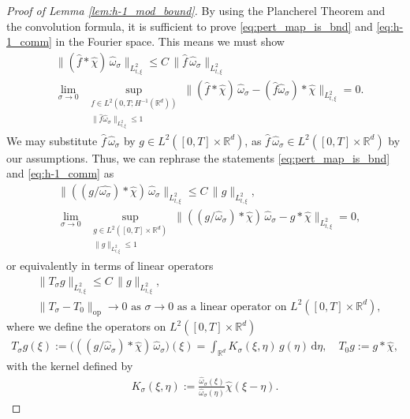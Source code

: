 \documentclass[reqno, 11pt]{amsart}
\numberwithin{equation}{section}
\theoremstyle{definition}
\begin{document}
\begin{proof}[Proof of Lemma \ref{lem:h-1_mod_bound}]
    By using the Plancherel Theorem and the convolution formula, it is sufficient to prove \eqref{eq:pert_map_is_bnd} and \eqref{eq:h-1_comm} in the Fourier space. This means we must show
    \begin{align*}
        &\|(\hat{f}\ast\hat{\chi})\,\hat{\omega}_\sigma\|_{L_{t,\xi}^2}\leq C\,\|\hat{f}\,\hat{\omega}_\sigma\|_{L_{t,\xi}^2}\\
        &\lim_{\sigma\to 0}\;\sup_{\substack{f\in L^2(0,T;H^{-1}(\mathbb{R}^{d})) \\ \|\hat{f}\hat{\omega}_\sigma\|_{L_{t,\xi}^2}\leq 1}} \|(\hat{f}\ast\hat{\chi})\,\hat{\omega}_\sigma-(\hat{f}\hat{\omega}_\sigma)\ast\hat{\chi}\|_{L_{t,\xi}^2}=0.
    \end{align*}
    We may substitute $\hat{f}\, \hat{\omega}_\sigma$ by $g\in L^2([0,T]\times \mathbb{R}^{d})$, as $\hat{f}\,\hat{\omega}_\sigma\in L^2([0,T]\times \mathbb{R}^{d})$ by our assumptions. Thus, we can rephrase the statements \eqref{eq:pert_map_is_bnd} and \eqref{eq:h-1_comm} as
    \begin{align*}
        &\|((g/\hat{\omega_\sigma})\ast\hat{\chi})\,\hat{\omega}_\sigma\|_{L_{t,\xi}^2}\leq C\,\|g\|_{L_{t,\xi}^2},\\
        &\lim_{\sigma\to 0}\;\sup_{\substack{g\in L^2([0,T]\times \mathbb{R}^{d}) \\ \|g\|_{L_{t,\xi}^2}\leq 1}} \|((g/\hat{\omega}_\sigma)\ast\hat{\chi})\,\hat{\omega}_\sigma-g\ast\hat{\chi}\|_{L_{t,\xi}^2}=0,
    \end{align*}
    or equivalently in terms of linear operators
    \begin{align*}
        &\|T_\sigma g\|_{L_{t,\xi}^2}\leq C\,\|g\|_{L_{t,\xi}^2},\\
        &\| T_\sigma-T_0\|_{\mathrm{op}}\rightarrow 0\text{ as }\sigma\rightarrow 0\text{ as a linear operator on }L^2([0,T]\times \mathbb{R}^{d}),
    \end{align*}
    where we define the operators on $L^2([0,T]\times \mathbb{R}^{d})$
    \begin{align*}
        T_\sigma g(\xi)
        :=\big(((g/\hat{\omega}_\sigma)\ast\hat{\chi})\,\hat{\omega}_\sigma\big)(\xi)=\int_{\mathbb{R}^{d}}K_\sigma(\xi,\eta)\,g(\eta)\,\mathrm{d}\eta,\quad
        T_0 g:=g\ast\hat{\chi},
    \end{align*}
    with the kernel defined by
    \begin{align*}
        K_\sigma(\xi,\eta):=\frac{\hat{\omega}_\sigma(\xi)}{\hat{\omega}_\sigma(\eta)}\hat{\chi}(\xi-\eta).
    \end{align*}
    

\end{proof}
\end{document}
